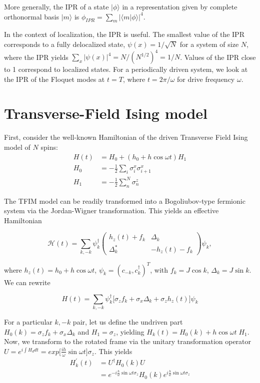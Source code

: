 \documentclass{article}
\begin{document}
More generally, the IPR of a state $|\phi\rangle$ in a representation given by complete orthonormal basis $|m\rangle$ is $\phi_{IPR} = \sum_m\vert\langle m \vert\phi\rangle\vert^4$.

In the context of localization, the IPR is useful. The smallest value of the IPR corresponds to a fully delocalized state, $\psi(x)=1/\sqrt{N}$ for a system of size $N$, where the IPR yields $\sum_x |\psi(x)|^4=N/(N^{1/2})^4=1/N$. Values of the IPR close to 1 correspond to localized states. For a periodically driven system, we look at the IPR of the Floquet modes at $t=T$, where $t=2\pi/\omega$ for drive frequency $\omega$.


\section{Transverse-Field Ising model}
First, consider the well-known Hamiltonian of the driven Transverse Field Ising model of $N$ spins:
\begin{align*}
 H(t) &= H_0 + \left(h_0 + h\cos{\omega t}\right) H_1\\
H_0 &= -\frac{1}{2}\sum_{i} \sigma^x_i \sigma^x_{i+1}\\
H_1 &= -\frac{1}{2}\sum_n^N \sigma^z_{n}
\end{align*}

The TFIM model can be readily transformed into a Bogoliubov-type fermionic system via the Jordan-Wigner transformation. This yields an effective Hamiltonian

\begin{equation*}
\mathcal{H}(t)=\sum_{{k, -k}} \psi_{{k}}^{\dagger}\left(\begin{array}{cc}
h_{z}(t)+f_{{k}} & \Delta_{{k}} \\
\Delta_{{k}}^{*} & -h_{z}(t)-f_{{k}}
\end{array}\right) \psi_{{k}},
\end{equation*}

where $h_z(t) = h_0 + h\cos{\omega t}$, $\psi_k = (c_{-k}, c^\dagger_k)^T$, with $f_k = J\cos{k}$, $\Delta_k = J\sin{k}$. We can rewrite

\begin{equation*}
H(t) = \sum_{k,-k} \psi^\dagger_k
\Big[\sigma_z f_k + \sigma_x \Delta_k + \sigma_z h_z(t)\Big]\psi_k
\end{equation*}

For a particular $k,-k$ pair, let us define the undriven part $H_0(k) = \sigma_z f_k + \sigma_x \Delta_k$ and $H_1 = \sigma_z$, yielding 
$H_k(t) = H_0(k) + h\cos{\omega t}\; H_1$. Now, we transform to the rotated frame via the unitary transformation operator $U = e^{i\int H_d d t} = exp \Big[\frac{i h}{\omega}\sin{\omega t}\Big]\sigma_z$. This yields
\begin{align*}
H^\prime_k(t) &= U^\dagger H_0(k) U \\
&=e^{-i\frac{h}{\omega}\sin{\omega t}\sigma_z} H_0(k) e^{i\frac{h}{\omega}\sin{\omega t}\sigma_z}\\
\end{align*}
\end{document}
